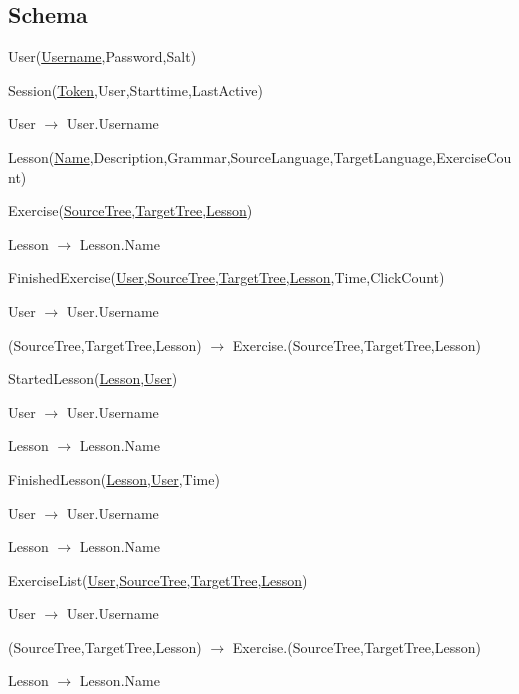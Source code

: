 \documentclass{scrartcl}
\begin{document}
\subsection{Schema}
\begin{description}
\item User(\underline{Username},Password,Salt)
\item Session(\underline{Token},User,Starttime,LastActive)
  \begin{description}
  \item User $\rightarrow$ User.Username
  \end{description}
\item Lesson(\underline{Name},Description,Grammar,SourceLanguage,TargetLanguage,ExerciseCount)
\item Exercise(\underline{SourceTree},\underline{TargetTree},\underline{Lesson})
  \begin{description}
  \item Lesson $\rightarrow$ Lesson.Name
  \end{description}
\item FinishedExercise(\underline{User},\underline{SourceTree},\underline{TargetTree},\underline{Lesson},Time,ClickCount)
  \begin{description}
  \item User $\rightarrow$ User.Username
  \item (SourceTree,TargetTree,Lesson) $\rightarrow$ Exercise.(SourceTree,TargetTree,Lesson)
  \end{description}
\item StartedLesson(\underline{Lesson},\underline{User})
  \begin{description}
  \item User $\rightarrow$ User.Username
  \item Lesson $\rightarrow$ Lesson.Name
  \end{description}
\item FinishedLesson(\underline{Lesson},\underline{User},Time)
  \begin{description}
  \item User $\rightarrow$ User.Username
  \item Lesson $\rightarrow$ Lesson.Name
  \end{description}
\item ExerciseList(\underline{User},\underline{SourceTree},\underline{TargetTree},\underline{Lesson})
  \begin{description}
  \item User $\rightarrow$ User.Username
  \item (SourceTree,TargetTree,Lesson) $\rightarrow$ Exercise.(SourceTree,TargetTree,Lesson)
  \item Lesson $\rightarrow$ Lesson.Name
  \end{description}
\end{description}
\end{document}
